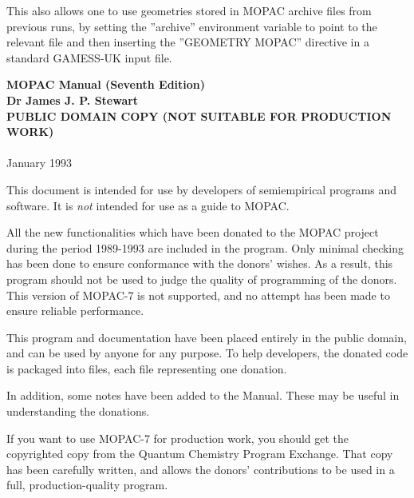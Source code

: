 \documentclass[11pt]{book}
\begin{document}
This also allows one to use geometries stored in MOPAC archive files
from previous runs, by setting the ''archive'' environment variable to
point to the relevant file and then inserting the ''GEOMETRY MOPAC''
directive in a standard GAMESS-UK input file.

\begin{titlepage}
\begin{center}
{\huge\bf MOPAC Manual (Seventh Edition)}\\
\vfill
\vfill
{\LARGE\bf Dr James J. P. Stewart}\\
\vfill
{\Large\bf PUBLIC DOMAIN COPY (NOT SUITABLE FOR PRODUCTION WORK)\\
\ \\
}
\vfill
{\Large January 1993}
\end{center}
\end{titlepage}


                   


 This document is intended for use by developers of semiempirical
programs and software.  It is {\em not} intended for use as a guide
to MOPAC.

All the new functionalities which have been donated to the MOPAC project
during the period 1989-1993 are included in the program.  Only minimal
checking has been done to ensure conformance with the donors' wishes.
As a result, this program should not be used to judge the quality
of programming of the donors.  This version of MOPAC-7 is not supported, 
and no attempt has been made to ensure reliable performance.

This program and documentation have been placed entirely in the public
domain, and can be used by anyone for any purpose.  
To help developers, the donated code is packaged into files, each
file representing one donation.

In addition, some notes have been added to the Manual.  These may be useful
in understanding the donations.


If you want to use MOPAC-7 for production work, you should get the
copyrighted copy from the Quantum Chemistry Program Exchange.  
That copy has been carefully written, and allows the donors' contributions
to be used in a full, production-quality program.

\lhead[\fancyplain{}{ }]{\fancyplain{}{\bf\rightmark}}
\rhead[\fancyplain{}{\bf\leftmark}]{\fancyplain{}{ }}
\end{document}
